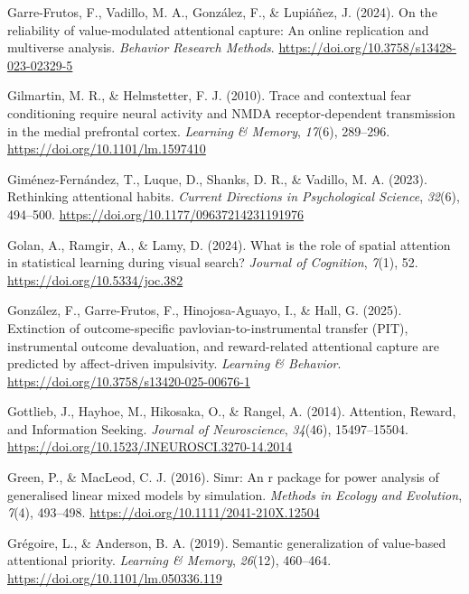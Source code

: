 \documentclass[
  man,
  floatsintext,
  longtable,
  nolmodern,
  notxfonts,
  notimes,
  mask,
  colorlinks=true,linkcolor=blue,citecolor=blue,urlcolor=blue]{apa7}
\newlength{\cslhangindent}
\newenvironment{CSLReferences}[2] %
 {\begin{list}{}{%
  \setlength{\itemindent}{0pt}
  \setlength{\leftmargin}{0pt}
  \setlength{\parsep}{0pt}
  \ifodd #1
   \setlength{\leftmargin}{\cslhangindent}
   \setlength{\itemindent}{-1\cslhangindent}
  \fi
  \setlength{\itemsep}{#2\baselineskip}}}
 {\end{list}}
\begin{document}
\begin{CSLReferences}{1}{0}
Garre-Frutos, F., Vadillo, M. A., González, F., \& Lupiáñez, J. (2024).
On the reliability of value-modulated attentional capture: An online
replication and multiverse analysis. \emph{Behavior Research Methods}.
\url{https://doi.org/10.3758/s13428-023-02329-5}

Gilmartin, M. R., \& Helmstetter, F. J. (2010). Trace and contextual
fear conditioning require neural activity and NMDA receptor-dependent
transmission in the medial prefrontal cortex. \emph{Learning \& Memory},
\emph{17}(6), 289--296. \url{https://doi.org/10.1101/lm.1597410}

Giménez-Fernández, T., Luque, D., Shanks, D. R., \& Vadillo, M. A.
(2023). Rethinking attentional habits. \emph{Current Directions in
Psychological Science}, \emph{32}(6), 494--500.
\url{https://doi.org/10.1177/09637214231191976}

Golan, A., Ramgir, A., \& Lamy, D. (2024). What is the role of spatial
attention in statistical learning during visual search? \emph{Journal of
Cognition}, \emph{7}(1), 52. \url{https://doi.org/10.5334/joc.382}

González, F., Garre-Frutos, F., Hinojosa-Aguayo, I., \& Hall, G. (2025).
Extinction of outcome-specific pavlovian-to-instrumental transfer (PIT),
instrumental outcome devaluation, and reward-related attentional capture
are predicted by affect-driven impulsivity. \emph{Learning \& Behavior}.
\url{https://doi.org/10.3758/s13420-025-00676-1}

Gottlieb, J., Hayhoe, M., Hikosaka, O., \& Rangel, A. (2014). Attention,
Reward, and Information Seeking. \emph{Journal of Neuroscience},
\emph{34}(46), 15497--15504.
\url{https://doi.org/10.1523/JNEUROSCI.3270-14.2014}

Green, P., \& MacLeod, C. J. (2016). Simr: An r package for power
analysis of generalised linear mixed models by simulation. \emph{Methods
in Ecology and Evolution}, \emph{7}(4), 493--498.
\url{https://doi.org/10.1111/2041-210X.12504}

Grégoire, L., \& Anderson, B. A. (2019). Semantic generalization of
value-based attentional priority. \emph{Learning \& Memory},
\emph{26}(12), 460--464. \url{https://doi.org/10.1101/lm.050336.119}


\end{CSLReferences}
\end{document}
